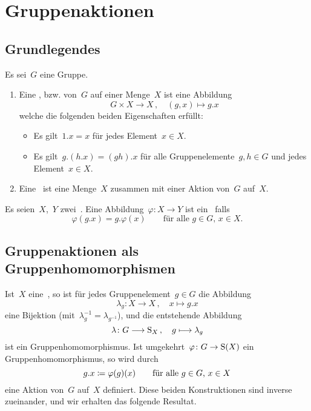 \section{Gruppenaktionen}



\subsection{Grundlegendes}

\begin{definition}
  Es sei~$G$ eine Gruppe.
  \begin{enumerate}
    \item
      Eine , bzw.  von~$G$ auf einer Menge~$X$  ist eine Abbildung
      \[
        G \times X \to X \,,
        \quad
        (g,x)
        \mapsto
        g.x
      \]
      welche die folgenden beiden Eigenschaften erfüllt:
      \begin{itemize}
        \item
          Es gilt~$1.x = x$ für jedes Element~$x \in X$.
        \item
          Es gilt~$g.(h.x) = (gh).x$ für alle Gruppenelemente~$g, h \in G$ und jedes Element~$x \in X$. 
      \end{itemize}
    \item
      Eine~ ist eine Menge~$X$ zusammen mit einer Aktion von~$G$ auf~$X$.
  \end{enumerate}
\end{definition}

\begin{definition}
  Es seien~$X$,~$Y$ zwei~.
  Eine Abbildung~$\varphi \colon X \to Y$ ist ein~ falls
  \[
    \varphi(g.x) = g.\varphi(x)
    \qquad
    \text{für alle~$g \in G$,~$x \in X$.}
  \]
\end{definition}



\subsection{Gruppenaktionen als Gruppenhomomorphismen}

Ist~$X$ eine~, so ist für jedes Gruppenelement~$g \in G$ die Abbildung
\[
  \lambda_g
  \colon
  X \to X \,,
  \quad
  x \mapsto g.x
\]
eine Bijektion (mit~$\lambda_g^{-1} = \lambda_{g^{-1}}$), und die entstehende Abbildung
\[
  \lambda
  \colon
  G \to \Sym_X \,,
  \quad
  g \mapsto \lambda_g
\]
ist ein Gruppenhomomorphismus.
Ist umgekehrt~$\varphi \colon G \to \Sym(X)$ ein Gruppenhomomorphismus, so wird durch
\[
  g.x \coloneqq \varphi(g)(x)
  \qquad
  \text{für alle~$g \in G$,~$x \in X$}
\]
eine Aktion von~$G$ auf~$X$ definiert.
Diese beiden Konstruktionen sind inverse zueinander, und wir erhalten das folgende Resultat.

